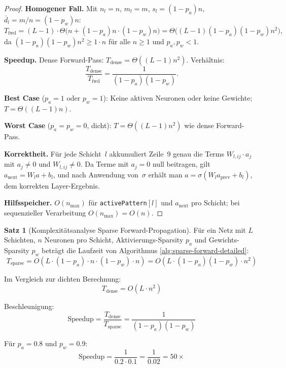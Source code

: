 \documentclass[a4paper,12pt]{report}
\theoremstyle{definition}
\newtheorem{satz}{Satz}
\begin{document}
\begin{proof}
		\textbf{Homogener Fall.} Mit $n_l = n$, $m_l = m$, $s_l = (1-p_a)n$, $\bar{d}_l = m/n = (1-p_w)n$:
		\[
			T_{\mathrm{fwd}} = (L-1) \cdot \Theta\!\bigl(n + (1-p_a)n \cdot (1-p_w)n\bigr)
			= \Theta\!\bigl((L-1)(1-p_a)(1-p_w)n^2\bigr),
		\]
		da $(1-p_a)(1-p_w)n^2 \geq 1 \cdot n$ für alle $n \geq 1$ und $p_a, p_w < 1$.

		\textbf{Speedup.} Dense Forward-Pass: $T_{\mathrm{dense}} = \Theta((L-1)n^2)$. Verhältnis:
		\[
			\frac{T_{\mathrm{dense}}}{T_{\mathrm{fwd}}} = \frac{1}{(1-p_a)(1-p_w)}.
		\]

		\textbf{Best Case} ($p_a = 1$ oder $p_w = 1$): Keine aktiven Neuronen oder keine Gewichte; $T = \Theta((L-1)n)$.

		\textbf{Worst Case} ($p_a = p_w = 0$, dicht): $T = \Theta((L-1)n^2)$ wie dense Forward-Pass.

		\textbf{Korrektheit.} Für jede Schicht~$l$ akkumuliert Zeile~9 genau die Terms $W_{l,ij} \cdot a_j$ mit $a_j \neq 0$ und $W_{l,ij} \neq 0$. Da Terme mit $a_j = 0$ null beitragen, gilt $a_{\mathrm{next}} = W_l a + b_l$, und nach Anwendung von~$\sigma$ erhält man $a = \sigma(W_l a_{\mathrm{prev}} + b_l)$, dem korrekten Layer-Ergebnis.

		\textbf{Hilfsspeicher.} $O(n_{\max})$ für \texttt{activePattern}$[l]$ und $a_{\mathrm{next}}$ pro Schicht; bei sequenzieller Verarbeitung $O(n_{\max}) = O(n)$.
	\end{proof}

	\begin{satz}[Komplexitätsanalyse Sparse Forward-Propagation]
		Für ein Netz mit $L$ Schichten, $n$ Neuronen pro Schicht, Aktivierungs-Sparsity $p_a$ und Gewichts-Sparsity $p_w$ beträgt die Laufzeit von Algorithmus \ref{alg:sparse-forward-detailed}:
		\[
		T_{\text{sparse}} = O\left( L \cdot (1-p_a) \cdot n \cdot (1-p_w) \cdot n \right) = O(L \cdot (1-p_a)(1-p_w) \cdot n^2)
		\]
		
		Im Vergleich zur dichten Berechnung:
		\[
		T_{\text{dense}} = O(L \cdot n^2)
		\]
		
		Beschleunigung:
		\[
		\text{Speedup} = \frac{T_{\text{dense}}}{T_{\text{sparse}}} = \frac{1}{(1-p_a)(1-p_w)}
		\]
		
		Für $p_a = 0.8$ und $p_w = 0.9$:
		\[
		\text{Speedup} = \frac{1}{0.2 \cdot 0.1} = \frac{1}{0.02} = 50\times
		\]
	\end{satz}
	
\end{document}
